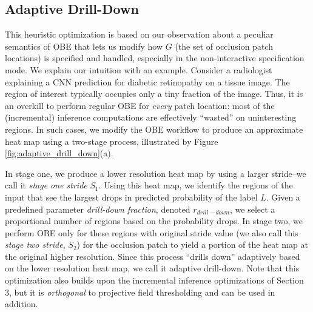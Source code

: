 \subsection{Adaptive Drill-Down}\label{sec:ada-drill-down}
This heuristic optimization is based on our observation about a peculiar semantics of OBE that lets us modify how $G$ (the set of occlusion patch locations) is specified and handled, especially in the non-interactive specification mode. We explain our intuition with an example. Consider a radiologist explaining a CNN prediction for diabetic retinopathy on a tissue image. The region of interest typically occupies only a tiny fraction of the image. Thus, it is an overkill to perform regular OBE for \textit{every} patch location: most of the (incremental) inference computations are effectively ``wasted'' on uninteresting regions. In such cases, we modify the OBE workflow to produce an approximate heat map using a two-stage process, illustrated by Figure \ref{fig:adaptive_drill_down}(a).

In stage one, we produce a lower resolution heat map by using a larger stride--we call it \textit{stage one stride} $S_1$. Using this heat map, we identify the regions of the input that see the largest drops in predicted probability of the label $L$. Given a predefined parameter \textit{drill-down fraction}, denoted $r_{\mathit{drill}-\mathit{down}}$, we select a proportional number of regions based on the probability drops. In stage two, we perform OBE only for these regions with original stride value (we also call this \textit{stage two stride}, $S_2$) for the occlusion patch to yield a portion of the heat map at the original higher resolution. Since this process ``drills down'' adaptively based on the lower resolution heat map, we call it adaptive drill-down. Note that this optimization also builds upon the incremental inference optimizations of Section 3, but it is \textit{orthogonal} to projective field thresholding and can be used in addition.


